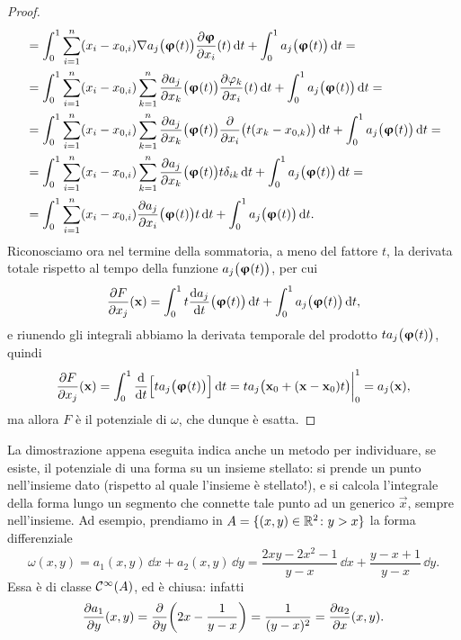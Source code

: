 \begin{proof}
\begin{equation}
\begin{split}
			&=\int_0^1\sum_{i=1}^n(x_i-x_{0,i})\nabla a_j\big(\bm{\upvarphi}(t)\big)\frac{\partial {\bm{\upvarphi}}}{\partial {x_i}}(t)\,\textup{d} t+\int_0^1a_j\big(\bm{\upvarphi}(t)\big)\,\textup{d} t=\\
			&=\int_0^1\sum_{i=1}^n(x_i-x_{0,i})\sum_{k=1}^n\frac{\partial {a_j}}{\partial {x_k}}\big(\bm{\upvarphi}(t)\big)\frac{\partial {\varphi_k}}{\partial {x_i}}(t)\,\textup{d} t+\int_0^1a_j\big(\bm{\upvarphi}(t)\big)\,\textup{d} t=\\
			&=\int_0^1\sum_{i=1}^n(x_i-x_{0,i})\sum_{k=1}^n\frac{\partial {a_j}}{\partial {x_k}}\big(\bm{\upvarphi}(t)\big)\frac{\partial {}}{\partial {x_i}}\big(t(x_k-x_{0,k})\big)\,\textup{d} t+\int_0^1a_j\big(\bm{\upvarphi}(t)\big)\,\textup{d} t=\\
			&=\int_0^1\sum_{i=1}^n(x_i-x_{0,i})\sum_{k=1}^n\frac{\partial {a_j}}{\partial {x_k}}\big(\bm{\upvarphi}(t)\big)t\delta_{ik}\,\textup{d} t+\int_0^1a_j\big(\bm{\upvarphi}(t)\big)\,\textup{d} t=\\
			&=\int_0^1\sum_{i=1}^n(x_i-x_{0,i})\frac{\partial {a_j}}{\partial {x_i}}\big(\bm{\upvarphi}(t)\big)t\,\textup{d} t+\int_0^1a_j\big(\bm{\upvarphi}(t)\big)\,\textup{d} t.
		\end{split}
	\end{equation}
	Riconosciamo ora nel termine della sommatoria, a meno del fattore $t$, la derivata totale rispetto al tempo della funzione $a_j\big(\bm{\upvarphi}(t)\big)$, per cui
	\begin{equation}
		\frac{\partial {F}}{\partial {x_j}}(\mathbf{x})=\int_0^1t\frac{\textup{d} {a_j}}{\textup{d} {t}}\big(\bm{\upvarphi}(t)\big)\,\textup{d} t+\int_0^1a_j\big(\bm{\upvarphi}(t)\big)\,\textup{d} t,
	\end{equation}
	e riunendo gli integrali abbiamo la derivata temporale del prodotto $ta_j\big(\bm{\upvarphi}(t)\big)$, quindi
	\begin{equation}
		\frac{\partial {F}}{\partial {x_j}}(\mathbf{x})=\int_0^1\frac{\textup{d} {}}{\textup{d} {t}}\Big[ta_j\big(\bm{\upvarphi}(t)\big)\Big]\,\textup{d} t=ta_j\big(\mathbf{x}_0+(\mathbf{x}-\mathbf{x}_0)t\big)\bigg|_0^1=a_j(\mathbf{x}),
	\end{equation}
	ma allora $F$ è il potenziale di $\omega$, che dunque è esatta.
\end{proof}
La dimostrazione appena eseguita indica anche un metodo per individuare, se esiste, il potenziale di una forma su un insieme stellato: si prende un punto nell'insieme dato (rispetto al quale l'insieme è stellato!), e si calcola l'integrale della forma lungo un segmento che connette tale punto ad un generico $\vec x$, sempre nell'insieme.
Ad esempio, prendiamo in $A=\{(x,y)\in\mathbb{R}^2\colon y>x\}$ la forma differenziale
\begin{equation*}
	\omega(x,y)=a_1(x,y)\,\dd x+a_2(x,y)\,\dd y=\frac{2xy-2x^2-1}{y-x}\,\dd x+\frac{y-x+1}{y-x}\,\dd y.
\end{equation*}
Essa è di classe $\mathcal{C}^{{\infty}}(A)$, ed è chiusa: infatti
\begin{equation}
	\frac{\partial {a_1}}{\partial {y}}(x,y)=\frac{\partial {}}{\partial {y}}\bigg(2x-\frac1{y-x}\bigg)=\frac1{(y-x)^2}=\frac{\partial {a_2}}{\partial {x}}(x,y).
\end{equation}
